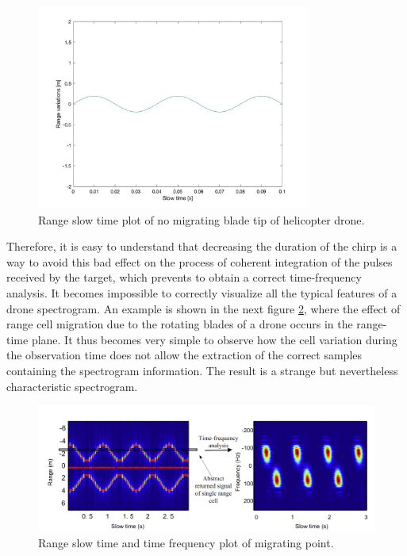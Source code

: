 \begin{figure}[h!]
    \centering
    \includegraphics[width=9cm]{Time-frequency analysis-chap3/img/helic_no_range_var_plot.jpg}
    \caption{Range slow time plot of no migrating blade tip of helicopter drone.}
    \label{no-migration-helic-plot}
\end{figure}
Therefore, it is easy to understand that decreasing the duration of the chirp is a way to avoid this bad effect on the process of coherent integration of the pulses received by the target, which prevents to obtain a correct time-frequency analysis. It becomes impossible to correctly visualize all the typical features of a drone spectrogram. An example is shown in the next figure \ref{spect-with-migration}, where the effect of range cell migration due to the rotating blades of a drone occurs in the range-time plane. It thus becomes very simple to observe how the cell variation during the observation time does not allow the extraction of the correct samples containing the spectrogram information. The result is a strange but nevertheless characteristic spectrogram.
\begin{figure}[h!]
    \centering
    \includegraphics[width=16cm]{Time-frequency analysis-chap3/img/spect with migration.png}
    \caption{Range slow time and time frequency plot of migrating point.\cite{chen_chinese}}
    \label{spect-with-migration}
\end{figure}
